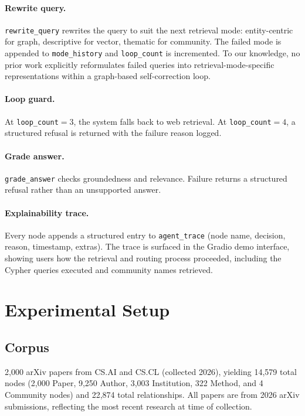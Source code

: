 \documentclass[11pt]{article}
\begin{document}
\paragraph{Rewrite query.}
\texttt{rewrite\_query} rewrites the query to suit the next retrieval
mode: entity-centric for graph, descriptive for vector, thematic for
community. The failed mode is appended to \texttt{mode\_history} and
\texttt{loop\_count} is incremented. To our knowledge, no prior work
explicitly reformulates failed queries into retrieval-mode-specific
representations within a graph-based self-correction loop.

\paragraph{Loop guard.}
At \texttt{loop\_count}$=3$, the system falls back to web retrieval. At
\texttt{loop\_count}$=4$, a structured refusal is returned with the
failure reason logged.

\paragraph{Grade answer.}
\texttt{grade\_answer} checks groundedness and relevance. Failure returns
a structured refusal rather than an unsupported answer.

\paragraph{Explainability trace.}
Every node appends a structured entry to \texttt{agent\_trace} (node
name, decision, reason, timestamp, extras). The trace is surfaced in the
Gradio demo interface, showing users how the retrieval and routing process
proceeded, including the Cypher queries executed and community names
retrieved.

\section{Experimental Setup}
\label{sec:setup}

\subsection{Corpus}

2,000 arXiv papers from CS.AI and CS.CL (collected 2026), yielding 14,579
total nodes (2,000 Paper, 9,250 Author, 3,003 Institution, 322 Method, and
4 Community nodes) and 22,874 total relationships. All papers are from 2026
arXiv submissions, reflecting the most recent research at time of
collection.
\end{document}
